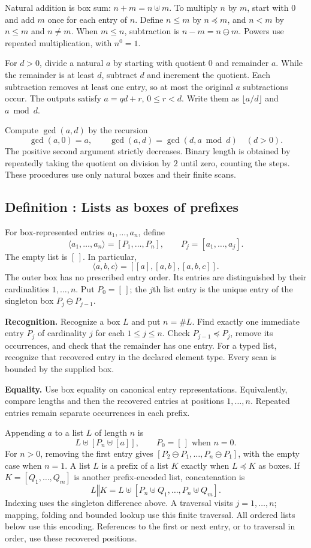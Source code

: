 \documentclass[11pt]{article}
\newcounter{definition}
\newcommand{\entry}[2]{%
  \refstepcounter{definition}\subsection*{#1 \thedefinition: #2}}
\newcommand{\definition}[1]{\entry{Definition}{#1}}
\newcommand{\checks}[2]{\begin{samepage}\par
  \textbf{Recognition.} #1\par\nopagebreak[4]
  \textbf{Equality.} #2\par\end{samepage}}
\begin{document}
Natural addition is box sum: $n+m=n\uplus m$. To multiply $n$ by $m$,
start with $0$ and add $m$ once for each entry of $n$.
Define $n\leq m$ by $n\preceq m$, and $n<m$ by $n\leq m$ and $n\ne m$.
When $m\leq n$, subtraction is $n-m=n\mathbin{\ominus}m$.
Powers use repeated multiplication, with $n^0=1$.

For $d>0$, divide a natural $a$ by starting with quotient $0$ and
remainder $a$. While the remainder is at least $d$, subtract $d$ and
increment the quotient. Each subtraction removes at least one entry,
so at most the original $a$ subtractions occur. The outputs satisfy
$a=qd+r$, $0\leq r<d$.
Write them as $\lfloor a/d\rfloor$ and $a\bmod d$.

Compute $\gcd(a,d)$ by the recursion
\[
 \gcd(a,0)=a,\qquad
 \gcd(a,d)=\gcd(d,a\bmod d)\quad(d>0).
\]
The positive second argument strictly decreases. Binary length is obtained
by repeatedly taking the quotient on division by $2$ until zero, counting
the steps. These procedures use only natural boxes and their finite scans.

\definition{Lists as boxes of prefixes}\label{def:lists}
For box-represented entries $a_1,\ldots,a_n$, define
\[
 \langle a_1,\ldots,a_n\rangle=[P_1,\ldots,P_n],
 \qquad P_j=[a_1,\ldots,a_j].
\]
The empty list is $[\,]$. In particular,
\[
                 \langle a,b,c\rangle=[[a],[a,b],[a,b,c]].
\]
The outer box has no prescribed entry order. Its entries are distinguished
by their cardinalities $1,\ldots,n$. Put $P_0=[\,]$; the $j$th list entry
is the unique entry of the singleton box $P_j\mathbin{\ominus}P_{j-1}$.

\checks{Recognize a box $L$ and put $n=\#L$. Find exactly one immediate
entry $P_j$ of cardinality $j$ for each $1\leq j\leq n$. Check
$P_{j-1}\preceq P_j$, remove its occurrences, and check that the
remainder has one entry. For a typed list, recognize that recovered entry
in the declared element type. Every scan is bounded by the supplied box.}
{Use box equality on canonical entry representations. Equivalently,
compare lengths and then the recovered entries at positions $1,\ldots,n$.
Repeated entries remain separate occurrences in each prefix.}

Appending $a$ to a list $L$ of length $n$ is
\[
       L\uplus[P_n\uplus[a]],\qquad P_0=[\,]\text{ when }n=0.
\]
For $n>0$, removing the first entry gives
$[P_2\mathbin{\ominus}P_1,\ldots,P_n\mathbin{\ominus}P_1]$,
with the empty case when $n=1$. A list $L$ is a prefix of a list $K$
exactly when $L\preceq K$ as boxes.
If $K=[Q_1,\ldots,Q_m]$ is another prefix-encoded list, concatenation is
\[
       L\mathbin{\Vert}K
          =L\uplus[P_n\uplus Q_1,\ldots,P_n\uplus Q_m].
\]
Indexing uses the singleton difference above. A traversal visits
$j=1,\ldots,n$; mapping, folding and bounded lookup use this finite
traversal. All ordered lists below use this encoding.
References to the first or next entry, or to traversal in order, use these
recovered positions.
\end{document}
